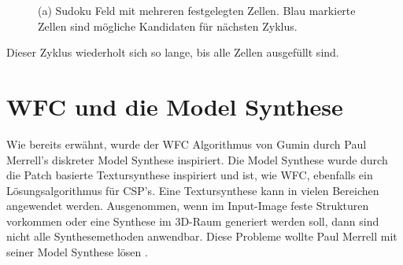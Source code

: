 \documentclass[12pt, a4paper,twoside,openright]{report} %
\begin{document}
\begin{figure}[H]
    \centering
    \caption{(a) Sudoku Feld mit mehreren festgelegten Zellen. Blau markierte Zellen sind mögliche Kandidaten für nächsten Zyklus.}%
\end{figure}

Dieser Zyklus wiederholt sich so lange, bis alle Zellen ausgefüllt sind.

\section{WFC und die Model Synthese}

Wie bereits erwähnt, wurde der WFC Algorithmus von Gumin durch Paul Merrell's diskreter Model Synthese inspiriert.
Die Model Synthese wurde durch die Patch basierte Textursynthese inspiriert und ist, wie WFC, ebenfalls ein Lösungsalgorithmus für CSP's.
\newline
Eine Textursynthese kann in vielen Bereichen angewendet werden.
Ausgenommen, wenn im Input-Image feste Strukturen vorkommen oder eine Synthese im 3D-Raum generiert werden soll,
dann sind nicht alle Synthesemethoden anwendbar.
Diese Probleme wollte Paul Merrell mit seiner Model Synthese lösen \cite{merrell2009model}.
\end{document}
